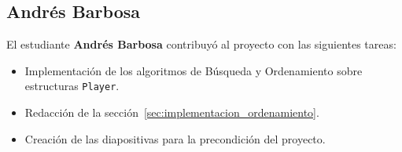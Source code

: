 \subsection{Andrés Barbosa}
El estudiante \textbf{Andrés Barbosa} contribuyó al proyecto con las siguientes tareas:
\begin{itemize}
    \item Implementación de los algoritmos de Búsqueda y Ordenamiento sobre estructuras \texttt{Player}.
    \item Redacción de la sección~\ref{sec:implementacion_ordenamiento}.
    \item Creación de las diapositivas para la precondición del proyecto.
\end{itemize}